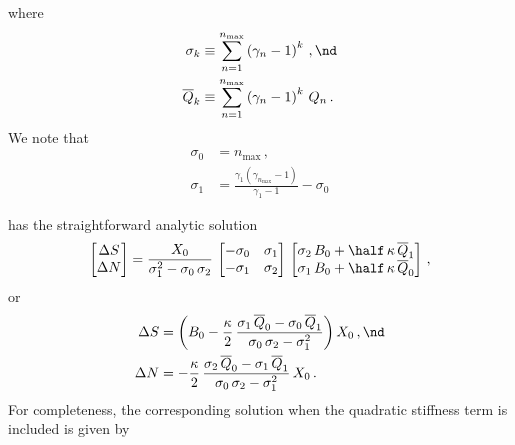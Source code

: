 where
 \begin{align}
\sigma_k &\equiv \sum_{n = 1}^{n_\text{max}} \left(\gamma_n - 1\right)^k\, , \nd \\
\overline{Q}_k &\equiv \sum_{n = 1}^{n_\text{max}} \left(\gamma_n - 1\right)^k\, Q_n\, .
 \end{align}
We note that
\begin{subequations}
  \begin{align}
    \sigma_0 &= n_\text{max}\, ,\\
    \sigma_1 &= \frac{\gamma_1 \left(\gamma_{n_\text{max}} - 1\right)}{\gamma_1 - 1} - \sigma_0
  \end{align}
\end{subequations}

  has the straightforward analytic solution
\begin{equation}
  \begin{bmatrix}
    \Delta S \\
    \Delta N
  \end{bmatrix} = \frac{X_0}{\sigma_1^2 - \sigma_0\, \sigma_2}\,
  \begin{bmatrix}
    -\sigma_0 & \sigma_1 \\
    -\sigma_1 & \sigma_2
  \end{bmatrix}\,
  \begin{bmatrix}
    \sigma_2\, B_0 + \half\, \kappa\, \overline{Q}_1 \\
    \sigma_1\, B_0 + \half\, \kappa\, \overline{Q}_0
  \end{bmatrix}\, ,
\end{equation}
or
\begin{subequations} \label{eqn:rms_sol}
  \begin{align}
    \label{eqn:rms_sol_ds} \Delta S &= \left(B_0 - \frac{\kappa}{2}\, \frac{\sigma_1\, \overline{Q}_0 - \sigma_0\, \overline{Q}_1}{\sigma_0\, \sigma_2 - \sigma_1^2} \right) X_0\, , \nd \\
    \label{eqn:rms_sol_dn} \Delta N &= -\frac{\kappa}{2}\, \frac{\sigma_2\, \overline{Q}_0 - \sigma_1\, \overline{Q}_1}{\sigma_0\, \sigma_2 - \sigma_1^2}\, X_0\, .
  \end{align}
\end{subequations}
For completeness, the corresponding solution when the quadratic stiffness term is included is given by
